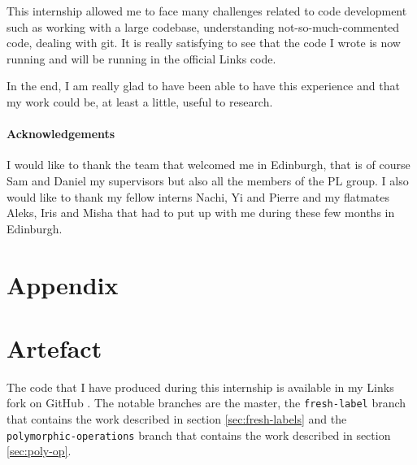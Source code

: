 \documentclass[10pt, nonacm=true, language=french, language=english]{acmart}
\begin{document}
This internship allowed me to face many challenges related to code development such as working with a large codebase, understanding not-so-much-commented code, dealing with git. It is really satisfying to see that the code I wrote is now running and will be running in the official Links code.

In the end, I am really glad to have been able to have this experience and that my work could be, at least a little, useful to research.

\paragraph{Acknowledgements}
\label{sec:acknowledgement}

I would like to thank the team that welcomed me in Edinburgh, that is of course Sam and Daniel my supervisors but also all the members of the PL group. I also would like to thank my fellow interns Nachi, Yi and Pierre and my flatmates Aleks, Iris and Misha that had to put up with me during these few months in Edinburgh.

























\newpage

\appendix

\section*{Appendix}

\section{Artefact}
\label{sec:code-production}

The code that I have produced during this internship is available in my Links fork on GitHub \cite{gh:mylinks}. The notable branches are the master, the \texttt{fresh-label} branch that contains the work described in section \ref{sec:fresh-labels} and the \texttt{polymorphic-operations} branch that contains the work described in section \ref{sec:poly-op}.
\end{document}
